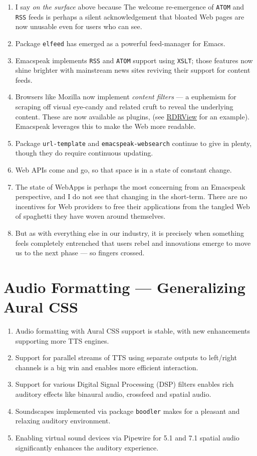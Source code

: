 \documentclass[11pt]{article}
\begin{document}
\begin{enumerate}
\item I say \emph{on the surface} above  because The welcome re-emergence of
\texttt{ATOM} and \texttt{RSS} feeds is perhaps a silent acknowledgement that
bloated Web pages are now unusable even for users who can see.
\item Package  \texttt{elfeed} has emerged as  a powerful feed-manager for Emacs.
\item Emacspeak implements  \texttt{RSS} and \texttt{ATOM} support using
\texttt{XSLT};  those features now shine brighter  with mainstream
news  sites reviving their support for content feeds.
\item Browsers like Mozilla now implement \emph{content filters} --- a
euphemism for scraping off  visual eye-candy and related cruft to
reveal the underlying content.  These are now 
available as  plugins, (see \href{https://github.com/eafer/rdrview}{RDRView} for an example).  Emacspeak 
leverages this to make the Web more readable.
\item Package \texttt{url-template} and \texttt{emacspeak-websearch} continue to give
in plenty, though they do require continuous updating.
\item Web APIs come and go, so 
that space is in  a state of constant change.
\item The state of WebApps is perhaps the most concerning from an
Emacspeak perspective, and I do not  see that changing in the
short-term.  There are no incentives for Web providers to
free their applications from the tangled Web of spaghetti they have woven
around themselves.
\item But as with everything else in our industry,
it is precisely when something feels completely entrenched that users
rebel and innovations emerge  to move us to the next phase --- so
fingers crossed.
\end{enumerate}
\section{Audio Formatting —  Generalizing Aural CSS}
\label{sec:orge1d254b}

\begin{enumerate}
\item Audio formatting with Aural CSS support is stable, with new
enhancements supporting more TTS engines.
\item Support for parallel streams of TTS using separate outputs to
left/right channels is a big win and enables more efficient interaction.
\item Support for various Digital Signal Processing (DSP)  filters enables   rich auditory effects
like  binaural audio, crossfeed and spatial audio.
\item Soundscapes implemented via package \texttt{boodler} makes for  a
pleasant and relaxing auditory environment.
\item Enabling virtual sound devices via Pipewire for 5.1  and 7.1
spatial audio significantly enhances the auditory experience.
\end{enumerate}
\end{document}

